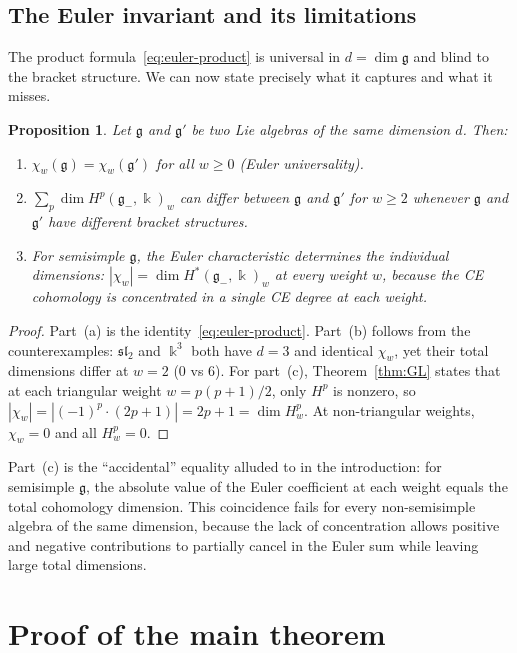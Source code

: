 \documentclass[11pt,reqno]{amsart}
\theoremstyle{plain}
\newtheorem{proposition}[theorem]{Proposition}
\theoremstyle{definition}
\theoremstyle{remark}
\newcommand{\fg}{\mathfrak{g}}
\newcommand{\gminus}{\fg_{-}}
\newcommand{\kk}{\Bbbk}
\begin{document}
\subsection{The Euler invariant and its limitations}

The product formula~\eqref{eq:euler-product} is universal in $d = \dim\fg$
and blind to the bracket structure. We can now state precisely what it
captures and what it misses.

\begin{proposition}\label{prop:euler-universal}
 Let $\fg$ and $\fg'$ be two Lie algebras of the same dimension $d$. Then:
 \begin{enumerate}[label=(\alph*)]
 \item $\chi_w(\fg) = \chi_w(\fg')$ for all $w \ge 0$ (Euler universality).
 \item $\sum_p \dim H^p(\gminus, \kk)_w$ can differ between $\fg$ and
 $\fg'$ for $w \ge 2$ whenever $\fg$ and $\fg'$ have different bracket
 structures.
 \item For semisimple $\fg$, the Euler characteristic determines the
 individual dimensions: $|\chi_w| = \dim H^*(\gminus,\kk)_w$ at every
 weight $w$, because the CE cohomology is concentrated in a single
 CE degree at each weight.
 \end{enumerate}
\end{proposition}

\begin{proof}
 Part~(a) is the identity~\eqref{eq:euler-product}. Part~(b) follows from
 the counterexamples: $\mathfrak{sl}_2$ and $\kk^3$ both have $d = 3$ and
 identical $\chi_w$, yet their total dimensions differ at $w = 2$ ($0$ vs
 $6$). For part~(c), Theorem~\ref{thm:GL} states that at each triangular
 weight $w = p(p+1)/2$, only $H^p$ is nonzero, so $|\chi_w| = |(-1)^p
 \cdot (2p+1)| = 2p+1 = \dim H^p_w$. At non-triangular weights, $\chi_w =
 0$ and all $H^p_w = 0$.
\end{proof}

Part~(c) is the ``accidental'' equality alluded to in the introduction:
for semisimple $\fg$, the absolute value of the Euler coefficient at each
weight equals the total cohomology dimension. This coincidence fails for
every non-semisimple algebra of the same dimension, because the lack of
concentration allows positive and negative contributions to partially cancel
in the Euler sum while leaving large total dimensions.


\section{Proof of the main theorem}
\label{sec:proof}
\end{document}

